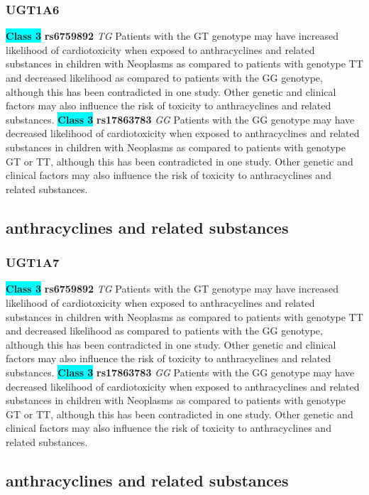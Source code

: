 \documentclass{book}
\begin{document}
\subsubsection{ UGT1A6 }

\begin{center}
\textbf{\colorbox{cyan} {Class 3}} \textbf{ rs6759892 } \textit{ TG }
Patients with the GT genotype may have increased likelihood of cardiotoxicity when exposed to anthracyclines and related substances in children with Neoplasms as compared to patients with genotype TT and decreased likelihood as compared to patients with the GG genotype, although this has been contradicted in one study. Other genetic and clinical factors may also influence the risk of toxicity to anthracyclines and related substances. \textbf{\colorbox{cyan} {Class 3}} \textbf{ rs17863783 } \textit{ GG }
Patients with the GG genotype may have decreased likelihood of cardiotoxicity when exposed to anthracyclines and related substances in children with Neoplasms as compared to patients with genotype GT or TT, although this has been contradicted in one study. Other genetic and clinical factors may also influence the risk of toxicity to anthracyclines and related substances.



\end{center}\subsection{ anthracyclines and related substances }


\subsubsection{ UGT1A7 }

\begin{center}
\textbf{\colorbox{cyan} {Class 3}} \textbf{ rs6759892 } \textit{ TG }
Patients with the GT genotype may have increased likelihood of cardiotoxicity when exposed to anthracyclines and related substances in children with Neoplasms as compared to patients with genotype TT and decreased likelihood as compared to patients with the GG genotype, although this has been contradicted in one study. Other genetic and clinical factors may also influence the risk of toxicity to anthracyclines and related substances. \textbf{\colorbox{cyan} {Class 3}} \textbf{ rs17863783 } \textit{ GG }
Patients with the GG genotype may have decreased likelihood of cardiotoxicity when exposed to anthracyclines and related substances in children with Neoplasms as compared to patients with genotype GT or TT, although this has been contradicted in one study. Other genetic and clinical factors may also influence the risk of toxicity to anthracyclines and related substances.



\end{center}\subsection{ anthracyclines and related substances }
\end{document}
